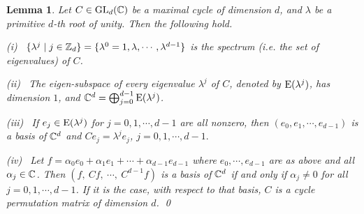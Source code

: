\documentclass{article}
\newtheorem{lemma}[theorem]{Lemma}
\numberwithin{equation}{section}
\begin{document}
\begin{lemma}\label{spectrum}
Let $C\in{\rm GL}_d({\Bbb C})$ be a maximal cycle of dimension $d$,
and $\lambda$ be a primitive $d$-th root of unity.
Then the following hold.

(i)~ $\{\lambda^j\mid j\in{\Bbb Z}_{d}\}
 =\{\lambda^0=1,\lambda,\cdots,\lambda^{d-1}\}$
is the spectrum (i.e. the set of eigenvalues) of $C$.

(ii)~ The eigen-subspace of every eigenvalue $\lambda^j$ of $C$,
denoted by ${\rm E}(\lambda^j)$, has dimension $1$, and
${\Bbb C}^{d}=\bigoplus_{j=0}^{d-1}{\rm E}(\lambda^j)$.

(iii)~ If $e_j\in {\rm E}(\lambda^j)$ for $j=0,1,\cdots, d-1$ are all nonzero, then
$(e_0,e_1,\cdots,e_{d-1})$ is a basis of ${\Bbb C}^{d}$ and
$Ce_j=\lambda^{j}e_j$, $j=0,1,\cdots,d-1.$

(iv)~ Let $f=\alpha_0e_0+\alpha_1e_1+\cdots+\alpha_{d-1}e_{d-1}$
where $e_0,\cdots,e_{d-1}$ are as above and all $\alpha_j\in{\Bbb C}$.
Then $(f, ~ Cf,~\cdots,~C^{d-1}f)$ is a basis of ${\Bbb C}^d$ if and only if
$\alpha_j\ne 0$ for all $j=0,1,\cdots,{d-1}$. 
If it is the case, with respect to that basis, 
$C$ is a cycle permutation matrix of dimension $d$. \qed
\end{lemma}
\end{document}
